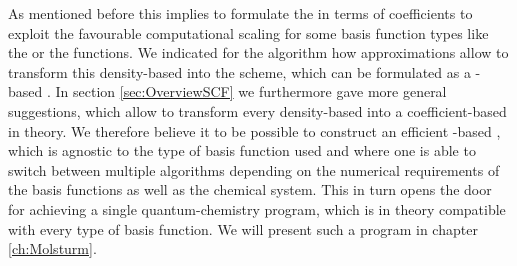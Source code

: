As mentioned before this implies to formulate the \SCF in terms of coefficients
to exploit the favourable computational scaling
for some basis function types like the \FE or the \CS functions.
We indicated for the \ODA algorithm
how approximations allow to transform this density-based
\SCF into the \tODA scheme,
which can be formulated as a \contraction-based \SCF.
In section \vref{sec:OverviewSCF} we furthermore gave more general suggestions,
which allow to transform every density-based \SCF
into a coefficient-based \SCF in theory.
We therefore believe it to be possible
to construct an efficient \contraction-based \SCF,
which is agnostic to the type of basis function used
and where one is able to switch between
multiple algorithms depending on the numerical requirements of the basis functions
as well as the chemical system.
This in turn opens the door
for achieving a single quantum-chemistry program,
which is in theory compatible with every type of basis function.
We will present such a program in chapter \vref{ch:Molsturm}.
